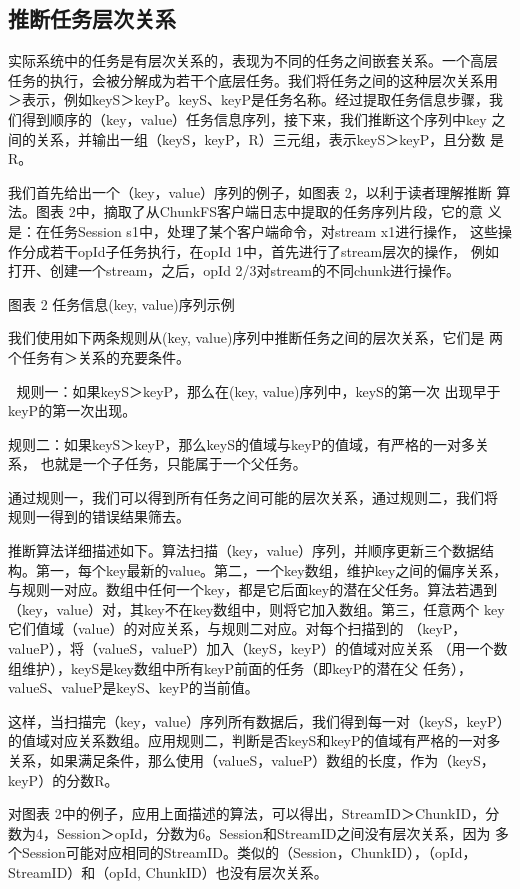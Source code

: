 \subsection{推断任务层次关系}

实际系统中的任务是有层次关系的，表现为不同的任务之间嵌套关系。一个高层
任务的执行，会被分解成为若干个底层任务。我们将任务之间的这种层次关系用
＞表示，例如keyS＞keyP。keyS、keyP是任务名称。经过提取任务信息步骤，我
们得到顺序的（key，value）任务信息序列，接下来，我们推断这个序列中key
之间的关系，并输出一组（keyS，keyP，R）三元组，表示keyS＞keyP，且分数
是R。

我们首先给出一个（key，value）序列的例子，如图表 2，以利于读者理解推断
算法。图表 2中，摘取了从ChunkFS客户端日志中提取的任务序列片段，它的意
义是：在任务Session s1中，处理了某个客户端命令，对stream x1进行操作，
这些操作分成若干opId子任务执行，在opId 1中，首先进行了stream层次的操作，
例如打开、创建一个stream，之后，opId 2/3对stream的不同chunk进行操作。
 
图表 2 任务信息(key, value)序列示例

我们使用如下两条规则从(key, value)序列中推断任务之间的层次关系，它们是
两个任务有＞关系的充要条件。

	规则一：如果keyS＞keyP，那么在(key, value)序列中，keyS的第一次
出现早于keyP的第一次出现。

规则二：如果keyS＞keyP，那么keyS的值域与keyP的值域，有严格的一对多关系，
也就是一个子任务，只能属于一个父任务。

通过规则一，我们可以得到所有任务之间可能的层次关系，通过规则二，我们将
规则一得到的错误结果筛去。

推断算法详细描述如下。算法扫描（key，value）序列，并顺序更新三个数据结
构。第一，每个key最新的value。第二，一个key数组，维护key之间的偏序关系，
与规则一对应。数组中任何一个key，都是它后面key的潜在父任务。算法若遇到
（key，value）对，其key不在key数组中，则将它加入数组。第三，任意两个
key它们值域（value）的对应关系，与规则二对应。对每个扫描到的
（keyP，valueP），将（valueS，valueP）加入（keyS，keyP）的值域对应关系
（用一个数组维护），keyS是key数组中所有keyP前面的任务（即keyP的潜在父
任务），valueS、valueP是keyS、keyP的当前值。

这样，当扫描完（key，value）序列所有数据后，我们得到每一对（keyS，keyP）
的值域对应关系数组。应用规则二，判断是否keyS和keyP的值域有严格的一对多
关系，如果满足条件，那么使用（valueS，valueP）数组的长度，作为（keyS，
keyP）的分数R。

对图表 2中的例子，应用上面描述的算法，可以得出，StreamID＞ChunkID，分
数为4，Session＞opId，分数为6。Session和StreamID之间没有层次关系，因为
多个Session可能对应相同的StreamID。类似的（Session，ChunkID），（opId，
StreamID）和（opId, ChunkID）也没有层次关系。


